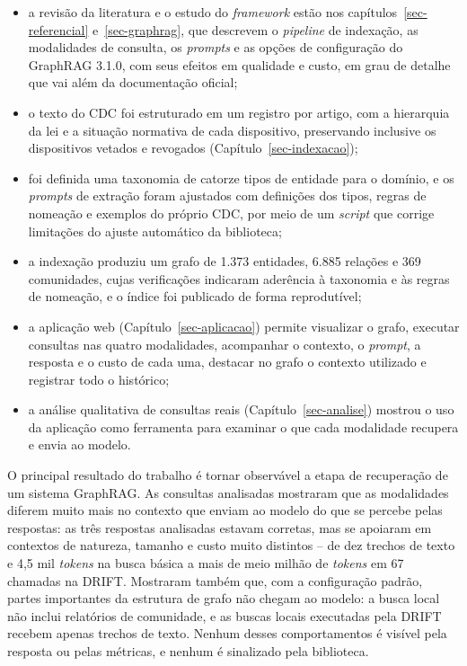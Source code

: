 \begin{itemize}
    \item a revisão da literatura e o estudo do \textit{framework} estão nos capítulos~\ref{sec-referencial} e~\ref{sec-graphrag}, que descrevem o \textit{pipeline} de indexação, as modalidades de consulta, os \textit{prompts} e as opções de configuração do GraphRAG 3.1.0, com seus efeitos em qualidade e custo, em grau de detalhe que vai além da documentação oficial;
    \item o texto do CDC foi estruturado em um registro por artigo, com a hierarquia da lei e a situação normativa de cada dispositivo, preservando inclusive os dispositivos vetados e revogados (Capítulo~\ref{sec-indexacao});
    \item foi definida uma taxonomia de catorze tipos de entidade para o domínio, e os \textit{prompts} de extração foram ajustados com definições dos tipos, regras de nomeação e exemplos do próprio CDC, por meio de um \textit{script} que corrige limitações do ajuste automático da biblioteca;
    \item a indexação produziu um grafo de 1.373 entidades, 6.885 relações e 369 comunidades, cujas verificações indicaram aderência à taxonomia e às regras de nomeação, e o índice foi publicado de forma reprodutível;
    \item a aplicação web (Capítulo~\ref{sec-aplicacao}) permite visualizar o grafo, executar consultas nas quatro modalidades, acompanhar o contexto, o \textit{prompt}, a resposta e o custo de cada uma, destacar no grafo o contexto utilizado e registrar todo o histórico;
    \item a análise qualitativa de consultas reais (Capítulo~\ref{sec-analise}) mostrou o uso da aplicação como ferramenta para examinar o que cada modalidade recupera e envia ao modelo.
\end{itemize}

O principal resultado do trabalho é tornar observável a etapa de recuperação de um sistema GraphRAG. As consultas analisadas mostraram que as modalidades diferem muito mais no contexto que enviam ao modelo do que se percebe pelas respostas: as três respostas analisadas estavam corretas, mas se apoiaram em contextos de natureza, tamanho e custo muito distintos -- de dez trechos de texto e 4,5 mil \textit{tokens} na busca básica a mais de meio milhão de \textit{tokens} em 67 chamadas na DRIFT. Mostraram também que, com a configuração padrão, partes importantes da estrutura de grafo não chegam ao modelo: a busca local não inclui relatórios de comunidade, e as buscas locais executadas pela DRIFT recebem apenas trechos de texto. Nenhum desses comportamentos é visível pela resposta ou pelas métricas, e nenhum é sinalizado pela biblioteca.

